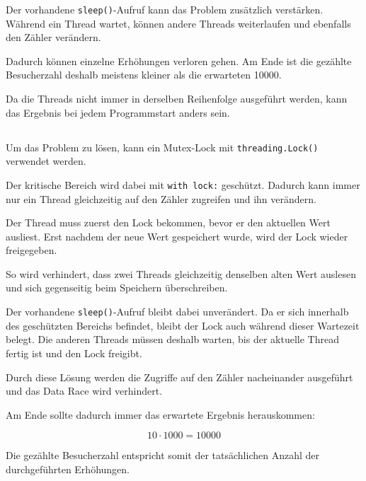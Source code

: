 \documentclass[a4paper,11pt]{article}
\begin{document}
	Der vorhandene \texttt{sleep()}-Aufruf kann das Problem zusätzlich verstärken. Während ein Thread wartet, können andere Threads weiterlaufen und ebenfalls den Zähler verändern.
	
	Dadurch können einzelne Erhöhungen verloren gehen. Am Ende ist die gezählte Besucherzahl deshalb meistens kleiner als die erwarteten 10000.
	
	Da die Threads nicht immer in derselben Reihenfolge ausgeführt werden, kann das Ergebnis bei jedem Programmstart anders sein.
	
	\subsection{}
	
	Um das Problem zu lösen, kann ein Mutex-Lock mit \texttt{threading.Lock()} verwendet werden.
	
	Der kritische Bereich wird dabei mit \texttt{with lock:} geschützt. Dadurch kann immer nur ein Thread gleichzeitig auf den Zähler zugreifen und ihn verändern.
	
	Der Thread muss zuerst den Lock bekommen, bevor er den aktuellen Wert ausliest. Erst nachdem der neue Wert gespeichert wurde, wird der Lock wieder freigegeben.
	
	So wird verhindert, dass zwei Threads gleichzeitig denselben alten Wert auslesen und sich gegenseitig beim Speichern überschreiben.
	
	Der vorhandene \texttt{sleep()}-Aufruf bleibt dabei unverändert. Da er sich innerhalb des geschützten Bereichs befindet, bleibt der Lock auch während dieser Wartezeit belegt. Die anderen Threads müssen deshalb warten, bis der aktuelle Thread fertig ist und den Lock freigibt.
	
	Durch diese Lösung werden die Zugriffe auf den Zähler nacheinander ausgeführt und das Data Race wird verhindert.
	
	Am Ende sollte dadurch immer das erwartete Ergebnis herauskommen:
	
	\[
	10 \cdot 1000 = 10000
	\]
	
	Die gezählte Besucherzahl entspricht somit der tatsächlichen Anzahl der durchgeführten Erhöhungen.
	
\end{document}
